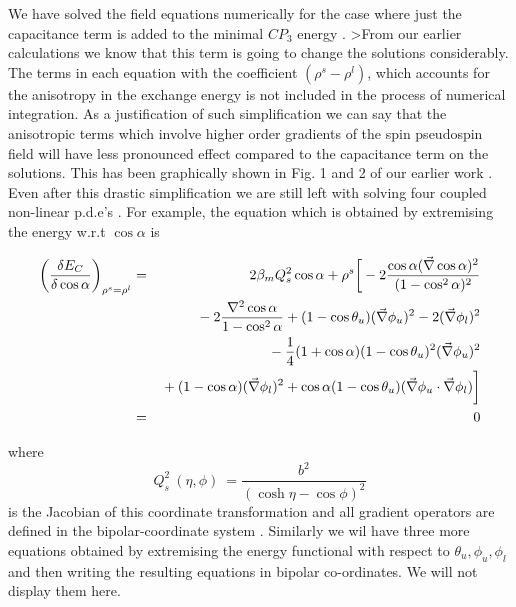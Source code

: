 We have solved the field equations
numerically for the case where just 
the capacitance term is added to the minimal $CP_3$ energy .
>From our earlier calculations
we know that this term is going to change the
solutions considerably. The terms in each equation with the coefficient
$(\rho^{s} - \rho^{l})$, which accounts for the anisotropy in
the exchange energy is not included in the process of numerical
integration. 
As a justification of such simplification
we can say that the anisotropic terms which involve higher order gradients
of the spin pseudospin field will have less pronounced effect compared
to the capacitance term on the solutions.
This has been graphically shown in Fig. 1
and 2 of our earlier work \cite{Ghosh2}.
Even after this drastic simplification we are still left with
solving four coupled
non-linear p.d.e's . For example, the
equation which is obtained by extremising the energy w.r.t
$\cos \alpha$ is

\begin{eqnarray}
\bigg(\frac{\delta E_{C}}{\delta \cos \alpha }\bigg)_{\rho^{s} = \rho^{l}}
& = & 2 \beta_{m} Q_{s}^{2} \cos \alpha 
+ \rho^{s} \bigg{[} -2\frac{ \cos \alpha  (\vec{\nabla} \cos \alpha )^{2}}{(1- \cos^{2} \alpha)^{2}} \nonumber \\
& &\mbox{} - 2\frac{\nabla^{2} \cos \alpha }{1 - \cos^{2}\alpha}
+ (1 - \cos \theta_{u} )(\vec{\nabla} \phi_{u})^{2} -2
(\vec{\nabla} \phi_{l})^{2} \nonumber \\
& &\mbox{} - \frac{1}{4} (1 + \cos \alpha )(1 - \cos \theta_{u})^{2}
(\vec{\nabla} \phi_{u})^{2} \nonumber \\
& &\mbox{} + (1 -\cos \alpha )(\vec{\nabla} \phi_{l})^{2} + 
\cos \alpha (1-\cos \theta_{u})(\vec{\nabla} \phi_{u} \cdot \vec{\nabla}
\phi_{l}) \bigg{]} \nonumber \\
& = & 0 \label{calpha} \end{eqnarray}

where 
\begin{equation} Q_{s}^{2} \ (\eta, \phi) \ =
\frac{b^{2}}{({\cosh{\eta}-\cos{\phi}})^{2}}
\label{Evar} \end{equation}
is the Jacobian of this coordinate transformation
and all gradient operators are defined in the bipolar-coordinate system
\cite{Margenau}. Similarly we wil have three more equations obtained
by extremising the energy functional
with respect to $\theta_{u} , \phi_{u} , \phi_{l}$ and then writing the
resulting equations in bipolar co-ordinates. We will not display them here. \\

